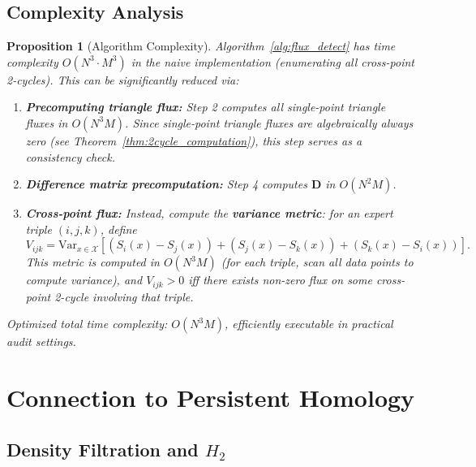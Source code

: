 \documentclass[12pt,a4paper]{article}
\theoremstyle{plain}
\newtheorem{proposition}[theorem]{Proposition}
\theoremstyle{definition}
\theoremstyle{remark}
\newcommand{\Var}{\mathrm{Var}}
\begin{document}
\subsection{Complexity Analysis}
\label{sec:complexity}

\begin{proposition}[Algorithm Complexity]
\label{prop:complexity}
Algorithm~\ref{alg:flux_detect} has time complexity $O(N^3 \cdot M^3)$ in the naive implementation (enumerating all cross-point 2-cycles). This can be significantly reduced via:

\begin{enumerate}[label=(\roman*), leftmargin=*]
    \item \textbf{Precomputing triangle flux:} Step 2 computes all single-point triangle fluxes in $O(N^3 M)$. Since single-point triangle fluxes are algebraically always zero (see Theorem~\ref{thm:2cycle_computation}), this step serves as a consistency check.
    \item \textbf{Difference matrix precomputation:} Step 4 computes $\mathbf{D}$ in $O(N^2 M)$.
    \item \textbf{Cross-point flux:} Instead, compute the \textbf{variance metric}: for an expert triple $(i,j,k)$, define
    \begin{equation}\label{eq:variance_metric}
        V_{ijk} = \Var_{x \in \mathcal{X}}\left[(S_i(x) - S_j(x)) + (S_j(x) - S_k(x)) + (S_k(x) - S_i(x))\right].
    \end{equation}
    This metric is computed in $O(N^3 M)$ (for each triple, scan all data points to compute variance), and $V_{ijk} > 0$ iff there exists non-zero flux on some cross-point 2-cycle involving that triple.
\end{enumerate}

Optimized total time complexity: $O(N^3 M)$, efficiently executable in practical audit settings.
\end{proposition}

\section{Connection to Persistent Homology}
\label{sec:persistent}

\subsection{Density Filtration and $H_2$}
\label{sec:density_filtration}
\end{document}
